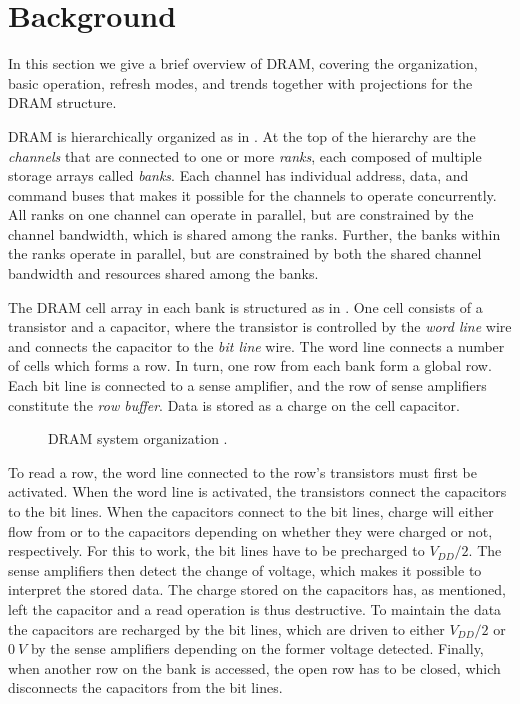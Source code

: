 \section{Background} 
\label{sec:bg}
In this section we give a brief overview of DRAM, covering the organization, basic operation, refresh modes, and trends together with projections for the DRAM structure. 

DRAM is hierarchically organized as in . At the top of the hierarchy are the \textit{channels} that are connected to one or more \textit{ranks}, each composed of multiple storage arrays called \textit{banks}. Each channel has individual address, data, and command buses that makes it possible for the channels to operate concurrently. All ranks on one channel can operate in parallel, but are constrained by the channel bandwidth, which is shared among the ranks. Further, the banks within the ranks operate in parallel, but are constrained by both the shared channel bandwidth and resources shared among the banks. 

The DRAM cell array in each bank is structured as in . One cell consists of a transistor and a capacitor, where the transistor is controlled by the \textit{word line} wire and connects the capacitor to the \textit{bit line} wire. The word line connects a number of cells which forms a row. In turn, one row from each bank form a global row. Each bit line is connected to a sense amplifier, and the row of sense amplifiers constitute the \textit{row buffer}. Data is stored as a charge on the cell capacitor.

\begin{figure*}[t]
    \centering
	\caption{DRAM system organization \cite{raidr}.}
	\label{fig:dram_org}
\end{figure*}

To read a row, the word line connected to the row's transistors must first be activated. When the word line is activated, the transistors connect the capacitors to the bit lines. When the capacitors connect to the bit lines, charge will either flow from or to the capacitors depending on whether they were charged or not, respectively. For this to work, the bit lines have to be precharged to $V_{DD}/2$. The sense amplifiers then detect the change of voltage, which makes it possible to interpret the stored data. The charge stored on the capacitors has, as mentioned, left the capacitor and a read operation is thus destructive. To maintain the data the capacitors are recharged by the bit lines, which are driven to either $V_{DD}/2$ or $0\:V$ by the sense amplifiers depending on the former voltage detected. Finally, when another row on the bank is accessed, the open row has to be closed, which disconnects the capacitors from the bit lines.


